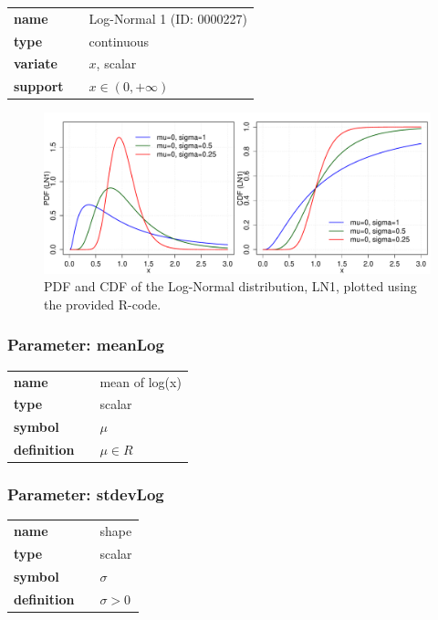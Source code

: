   \bigskip 

\begin{tabular}{p{2cm}cl}
\textbf{name} & & Log-Normal 1 (ID: 0000227)\\ 
 
\textbf{type} & & continuous \\ 

\textbf{variate} & & $x$, scalar \\ 

\textbf{support} & & $x \in (0,+\infty)$
\end{tabular}

\begin{figure}[htb!]
\centering
  \includegraphics[width=140mm]{pics/LogNormal_pdf_cdf.pdf}
 \caption{PDF and CDF of the Log-Normal distribution, LN1,
 plotted using the provided R-code.}
 \label{fig:LN1pdfcdf}
\end{figure}

\subsubsection*{Parameter: meanLog}

\noindent\begin{tabular}{p{2cm}cl}
\textbf{name} & & mean of log(x) \\
\textbf{type} & & scalar \\
\textbf{symbol} & & $\mu$  \\
\textbf{definition} & & $\mu \in R$
\end{tabular}
\subsubsection*{Parameter: stdevLog}

\noindent\begin{tabular}{p{2cm}cl}
\textbf{name} & & shape \\
\textbf{type} & & scalar \\
\textbf{symbol} & & $\sigma$  \\
\textbf{definition} & & $\sigma > 0$
\end{tabular}
